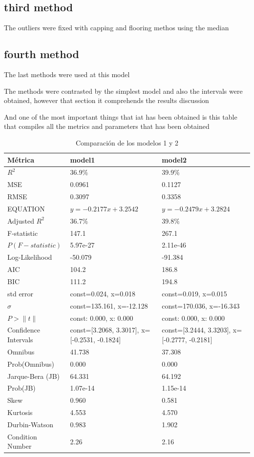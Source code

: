 \documentclass{article}
\begin{document}
\subsection{third method}
The outliers were fixed with capping and flooring methos using the median
\subsection{fourth method}
The last methods were used at this model

The methods were contrasted by the simplest model and also the intervals were obtained, however that section it comprehends the results discussion

And one of the most important things that iat has been obtained is this table that compiles all the metrics and parameters that has been obtained
\begin{table}[h]
  \centering
  \small %
  \begin{tabular}{|l|l|l|}
  \hline
  \textbf{Métrica} & \textbf{model1} & \textbf{model2} \\
  \hline
  $R^2$ & 36.9\% & 39.9\% \\
  \hline
  MSE & 0.0961 & 0.1127 \\
  \hline
  RMSE & 0.3097 & 0.3358 \\
  \hline
  EQUATION & $y=-0.2177x+3.2542$ & $y=-0.2479x+3.2824$ \\
  \hline
  Adjusted $R^2$ & 36.7\% & 39.8\% \\
  \hline
  F-statistic & 147.1 & 267.1 \\
  \hline
  $P(F-statistic)$ & 5.97e-27 & 2.11e-46 \\
  \hline
  Log-Likelihood & -50.079 & -91.384 \\
  \hline
  AIC & 104.2 & 186.8 \\
  \hline
  BIC & 111.2 & 194.8 \\
  \hline
  std error & const=0.024, x=0.018 & const=0.019, x=0.015 \\
  \hline
  $\sigma$ & const=135.161, x=-12.128 & const=170.036, x=-16.343 \\
  \hline
  $P>\|t\|$ & const: 0.000, x: 0.000 & const: 0.000, x: 0.000 \\
  \hline
  Confidence Intervals & const=[3.2068, 3.3017], x=[-0.2531, -0.1824] & const=[3.2444, 3.3203], x=[-0.2777, -0.2181] \\
  \hline
  Omnibus & 41.738 & 37.308 \\
  \hline
  Prob(Omnibus) & 0.000 & 0.000 \\
  \hline
  Jarque-Bera (JB) & 64.331 & 64.192 \\
  \hline
  Prob(JB) & 1.07e-14 & 1.15e-14 \\
  \hline
  Skew & 0.960 & 0.581 \\
  \hline
  Kurtosis & 4.553 & 4.570 \\
  \hline
  Durbin-Watson & 0.983 & 1.902 \\
  \hline
  Condition Number & 2.26 & 2.16 \\
  \hline
  \end{tabular}
  \caption{Comparación de los modelos 1 y 2}
  \label{tab:modelos12}
  \end{table}
  
\end{document}
